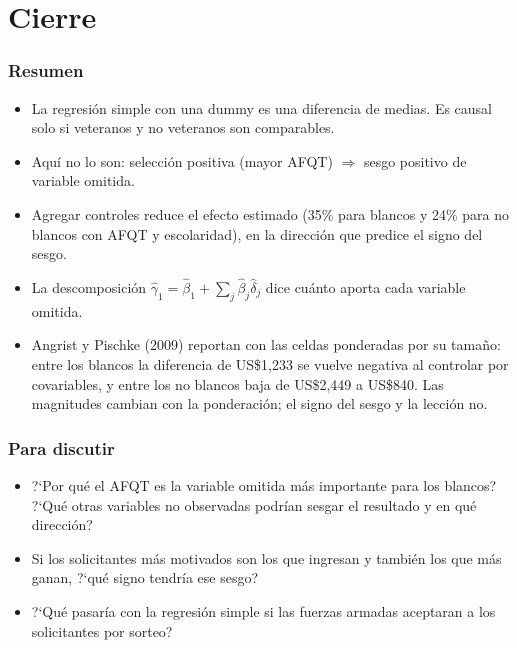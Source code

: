 \documentclass[t, compress, spanish, aspectratio=169]{beamer}
\begin{document}
	\section{Cierre}

	\begin{frame}
		\frametitle{Resumen}
		\small
		\begin{itemize}
			\item La regresi\'on simple con una dummy es una diferencia de medias. Es causal solo si veteranos y no veteranos son comparables.
			\item Aqu\'i no lo son: \alert{selecci\'on positiva} (mayor AFQT) $\Rightarrow$ sesgo positivo de variable omitida.
			\item Agregar controles reduce el efecto estimado (35\% para blancos y 24\% para no blancos con AFQT y escolaridad), en la direcci\'on que predice el signo del sesgo.
			\item La descomposici\'on $\widehat \gamma_1 = \widehat \beta_1 + \sum_j \widehat \beta_j \widehat \delta_j$ dice cu\'anto aporta cada variable omitida.
			\item Angrist y Pischke (2009) reportan con las celdas ponderadas por su tama\~no: entre los blancos la diferencia de US\$1,233 se vuelve negativa al controlar por covariables, y entre los no blancos baja de US\$2,449 a US\$840. \alert{Las magnitudes cambian con la ponderaci\'on; el signo del sesgo y la lecci\'on no.}
		\end{itemize}
	\end{frame}

	\begin{frame}
		\frametitle{Para discutir}
		\small
		\begin{itemize}
			\item ?`Por qu\'e el AFQT es la variable omitida m\'as importante para los blancos? ?`Qu\'e otras variables no observadas podr\'ian sesgar el resultado y en qu\'e direcci\'on?
			\item Si los solicitantes m\'as motivados son los que ingresan y tambi\'en los que m\'as ganan, ?`qu\'e signo tendr\'ia ese sesgo?
			\item ?`Qu\'e pasar\'ia con la regresi\'on simple si las fuerzas armadas aceptaran a los solicitantes por sorteo?
		\end{itemize}
	\end{frame}
\end{document}

